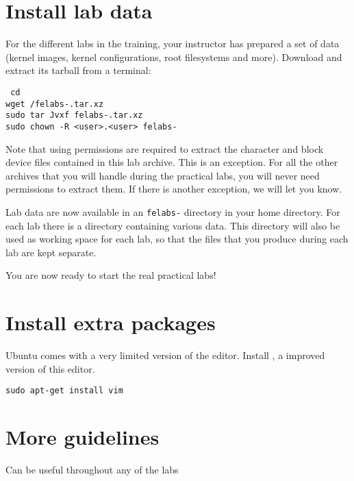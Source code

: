 
\section{Install lab data}

For the different labs in the training, your instructor has prepared a
set of data (kernel images, kernel configurations, root filesystems
and more). Download and extract its tarball from a terminal:


{\small
{\tt
cd \\
wget \sessionurl/felabs-\longname.tar.xz \\
sudo tar Jvxf felabs-\longname.tar.xz \\
sudo chown -R <user>.<user> felabs-\longname \\
}
}

Note that using  permissions are required to extract the
character and block device files contained in this lab archive. This is
an exception. For all the other archives that you will handle during
the practical labs, you will never need  permissions to
extract them. If there is another exception, we will let you know.

Lab data are now available in an {\tt felabs-\longname} directory in
your home directory. For each lab there is a directory containing
various data. This directory will also be used as working space for
each lab, so that the files that you produce during each lab are kept
separate.

You are now ready to start the real practical labs!

\section{Install extra packages}

Ubuntu comes with a very limited version of the 
editor. Install , a improved version of this editor.

\begin{verbatim}
sudo apt-get install vim
\end{verbatim}

\section{More guidelines}

Can be useful throughout any of the labs

